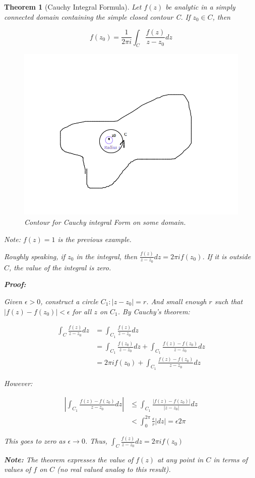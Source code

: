\documentclass{article}
\newtheorem{theorem}{Theorem}[section]
\theoremstyle{definition}
\begin{document}
\begin{theorem}[Cauchy Integral Formula]
	
Let $f(z)$ be analytic in a simply connected domain containing the simple closed contour C. If $z_0 \in C$, then 

$$f(z_0) = \frac{1}{2\pi i}\int_{C} \frac{f(z)}{z-z_0}dz$$

\begin{figure}[H]
	\centering
	\includegraphics[width=0.7\linewidth]{intform}
	\caption{Contour for Cauchy integral Form on some domain.}
	\label{fig:intform}
\end{figure}

Note: $f(z)=1$ is the previous example.

Roughly speaking, if $z_0$ in the integral, then $\frac{f(z)}{z-z_0}dz = 2\pi i f(z_0)$. If it is outside $C$, the value of the integral is zero. 

\textbf{Proof:}

Given $\epsilon>0$, construct a circle $C_1: |z-z_0|=r$. And small enough $r$ such that $|f(z) - f(z_0)|<\epsilon$ for all $z$ on $C_1$. By Cauchy's theorem:

\begin{align*}
\int_C \frac{f(z)}{z-z_0}dz &= \int_{C_1} \frac{f(z)}{z-z_0}dz\\ 
& = \int_{C_1} \frac{f(z_0)}{z-z_0}dz +  \int_{C_1} \frac{f(z) - f(z_0)}{z-z_0}dz\\
 & = 2 \pi i f(z_0) +  \int_{C_1} \frac{f(z) - f(z_0)}{z-z_0}dz
\end{align*}

However:

\begin{align*}
\left|\int_{C_1} \frac{f(z) - f(z_0)}{z-z_0}dz \right| &\leq \int_{C_1} \frac{|f(z) - f(z_0)|}{|z-z_0|}dz \\
&< \int_{0}^{2\pi} \frac{\epsilon}{r} |dz| = \epsilon 2 \pi 
\end{align*}

This goes to zero as $\epsilon \to 0$. Thus, $\int_C \frac{f(z)}{z-z_0}dz = 2 \pi i f(z_0)$

\textbf{Note:} The theorem expresses the value of $f(z)$ at any point in $C$ in terms of values of $f$ on $C$ (no real valued analog to this result).
\end{theorem}
\end{document}
